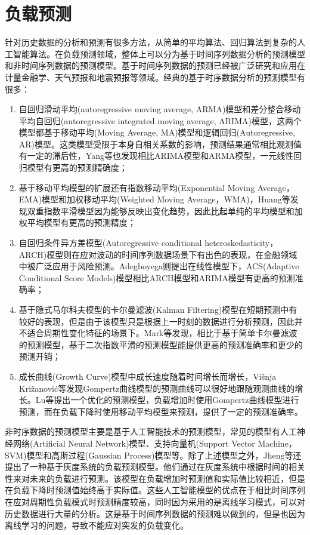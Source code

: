 \section{负载预测}
针对历史数据的分析和预测有很多方法，从简单的平均算法、回归算法到复杂的人工智能算法。在负载预测领域，整体上可以分为基于时间序列数据\cite{hamilton1994time}分析的预测模型和非时间序列数据的预测模型。基于时间序列数据的预测已经被广泛研究和应用在计量金融学、天气预报和地震预报等领域。经典的基于时序数据分析的预测模型有很多：
\begin{enumerate}
\item 自回归滑动平均(autoregressive moving average, ARMA)模型和差分整合移动平均自回归(autoregressive integrated moving average, ARIMA)模型，这两个模型都基于移动平均(Moving Average, MA)模型和逻辑回归(Autoregressive, AR)模型\cite{box2015time}。这类模型受限于本身自相关系数的影响，预测结果通常相比观测值有一定的滞后性，Yang等也发现相比ARIMA模型和ARMA模型，一元线性回归模型有更高的预测精确度\cite{yang2013workload}；
\item 基于移动平均模型的扩展还有指数移动平均(Exponential Moving Average，EMA)模型\cite{xiao2013dynamic}和加权移动平均(Weighted Moving Average，WMA)\cite{wu1989time}，Huang等发现双重指数平滑模型因为能够反映出变化趋势，因此比起单纯的平均模型和加权平均模型有更高的预测精度\cite{huang2012resource}；
\item 自回归条件异方差模型(Autoregressive conditional heteroskedasticity，ARCH)模型\cite{bollerslev1986generalized}则在应对波动的时间序列数据场景下有出色的表现，在金融领域中被广泛应用于风险预测。Adegboyega则提出在线性模型下，ACS(Adaptive Conditional Score Models)模型相比ARCH模型和ARIMA模型有更高的预测准确率\cite{adegboyega2015dynamic}；
\item 基于隐式马尔科夫模型的卡尔曼滤波(Kalman Filtering)模型\cite{goodwin2014adaptive}在短期预测中有较好的表现，但是由于该模型只是根据上一时刻的数据进行分析预测，因此并不适合周期性变化特征的场景下。Mark等发现，相比于基于简单卡尔曼滤波的预测模型，基于二次指数平滑的预测模型能提供更高的预测准确率和更少的预测开销\cite{mark2011evolutionary}；
\item 成长曲线(Growth Curve)模型中成长速度随着时间增长而增长，Višnja Križanović等发现Gompertz曲线模型的预测曲线可以很好地跟随观测曲线的增长\cite{vcik2016comparison}。Lu等提出一个优化的预测模型，负载增加时使用Gompertz曲线模型进行预测，而在负载下降时使用移动平均模型来预测，提供了一定的预测准确率\cite{lu2014dynamic}。
\end{enumerate}

非时序数据的预测模型主要是基于人工智能技术的预测模型，常见的模型有人工神经网络(Artificial Neural Network)模型、支持向量机(Support Vector Machine，SVM)模型和高斯过程(Gaussian Process)模型等。除了上述模型之外，Jheng等还提出了一种基于灰度系统的负载预测模型\cite{jheng2014novel}。他们通过在灰度系统中根据时间的相关性来对未来的负载进行预测。该模型在负载增加时预测值和实际值比较相近，但是在负载下降时预测值始终高于实际值。这些人工智能模型的优点在于相比时间序列在应对周期性负载模式时预测精度较高，同时因为采用的是离线学习模式，可以对历史数据进行大量的分析。这是基于时间序列数据的预测难以做到的，但是也因为离线学习的问题，导致不能应对突发的负载变化。

